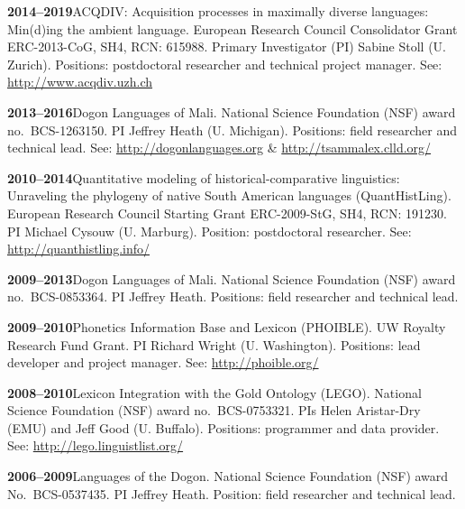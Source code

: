 \documentclass[11pt]{article}
\newcommand{\hangpara}{
 \setlength{\parindent}{0in} %
 \hangindent=0.42in %
}
\begin{document}

\hangpara
{\bf 2014--2019}\hspace{1ex}ACQDIV: Acquisition processes in maximally diverse languages: Min(d)ing the ambient language. European Research Council Consolidator Grant ERC-2013-CoG, SH4, RCN: 615988. Primary Investigator (PI) Sabine Stoll (U. Zurich). Positions: postdoctoral researcher and technical project manager. See: \url{http://www.acqdiv.uzh.ch}

\vskip 6pt
\hangpara
{\bf 2013--2016}\hspace{1ex}Dogon Languages of Mali. National Science Foundation (NSF) award no.\ BCS-1263150. PI Jeffrey Heath (U. Michigan). Positions: field researcher and technical lead. See: \url{http://dogonlanguages.org} \& \url{http://tsammalex.clld.org/}

\vskip 6pt
\hangpara
{\bf 2010--2014}\hspace{1ex}Quantitative modeling of historical-comparative linguistics: Unraveling the phylogeny of native South American languages (QuantHistLing). European Research Council Starting Grant ERC-2009-StG, SH4, RCN: 191230. PI Michael Cysouw (U. Marburg). Position: postdoctoral researcher. See: \url{http://quanthistling.info/}

\vskip 6pt
\hangpara
{\bf 2009--2013}\hspace{1ex}Dogon Languages of Mali. National Science Foundation (NSF) award no.\ BCS-0853364. PI Jeffrey Heath. Positions: field researcher and technical lead.

\vskip 6pt
\hangpara
{\bf 2009--2010}\hspace{1ex}Phonetics Information Base and Lexicon (PHOIBLE). UW Royalty Research Fund Grant. PI Richard Wright (U. Washington). Positions: lead developer and project manager. See: \url{http://phoible.org/}

\vskip 6pt
\hangpara
{\bf 2008--2010}\hspace{1ex}Lexicon Integration with the Gold Ontology (LEGO). National Science Foundation (NSF) award no.\ BCS-0753321. PIs Helen Aristar-Dry (EMU) and Jeff Good (U. Buffalo). Positions: programmer and data provider. See: \url{http://lego.linguistlist.org/}

\vskip 6pt
\hangpara
{\bf 2006--2009}\hspace{1ex}Languages of the Dogon. National Science Foundation (NSF) award No.\ BCS-0537435. PI Jeffrey Heath. Position: field researcher and technical lead.
\end{document}
